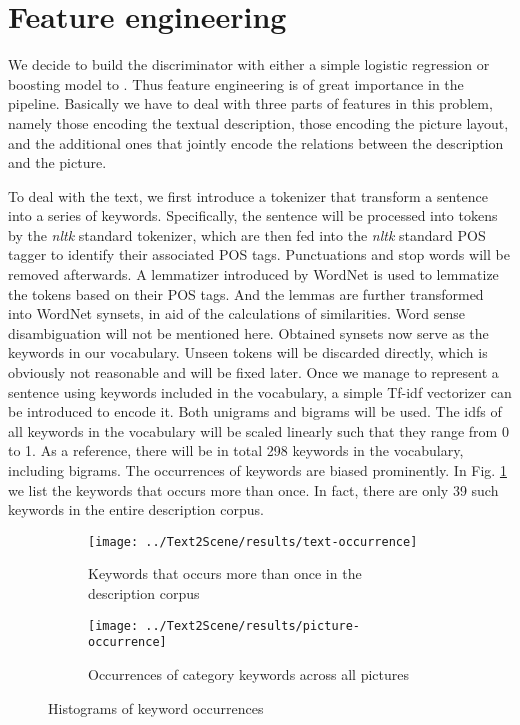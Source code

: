 \documentclass{article} %
\begin{document}
\section{Feature engineering}
We decide to build the discriminator with either a simple logistic regression or boosting model to . Thus feature engineering is of great importance in the pipeline. Basically we have to deal with three parts of features in this problem, namely those encoding the textual description, those encoding the picture layout, and the additional ones that jointly encode the relations between the description and the picture.

To deal with the text, we first introduce a tokenizer that transform a sentence into a series of keywords. Specifically, the sentence will be processed into tokens by the \emph{nltk} standard tokenizer, which are then fed into the \emph{nltk} standard POS tagger to identify their associated POS tags. Punctuations and stop words will be removed afterwards. A lemmatizer introduced by WordNet is used to lemmatize the tokens based on their POS tags. And the lemmas are further transformed into WordNet synsets, in aid of the calculations of similarities. Word sense disambiguation will not be mentioned here. Obtained synsets now serve as the keywords in our vocabulary. Unseen tokens will be discarded directly, which is obviously not reasonable and will be fixed later. Once we manage to represent a sentence using keywords included in the vocabulary, a simple Tf-idf vectorizer can be introduced to encode it. Both unigrams and bigrams will be used. The idfs of all keywords in the vocabulary will be scaled linearly such that they range from 0 to 1. As a reference, there will be in total 298 keywords in the vocabulary, including bigrams. The occurrences of keywords are biased prominently. In Fig. \ref{fig: text-occurrence} we list the keywords that occurs more than once. In fact, there are only 39 such keywords in the entire description corpus. 

\begin{figure}[htbp]
  	\centering
	\begin{subfigure}{.42\linewidth}
	\centering
	\texttt{[image: ../Text2Scene/results/text-occurrence]}
	\caption{Keywords that occurs more than once in the description corpus}
	\label{fig: text-occurrence}
	\end{subfigure}
	\begin{subfigure}{.57\linewidth}
	\centering
	\texttt{[image: ../Text2Scene/results/picture-occurrence]}
	\caption{Occurrences of category keywords across all pictures}
	\label{fig: picture-occurrence}
	\end{subfigure}
	\caption{Histograms of keyword occurrences}
\end{figure}
\end{document}
